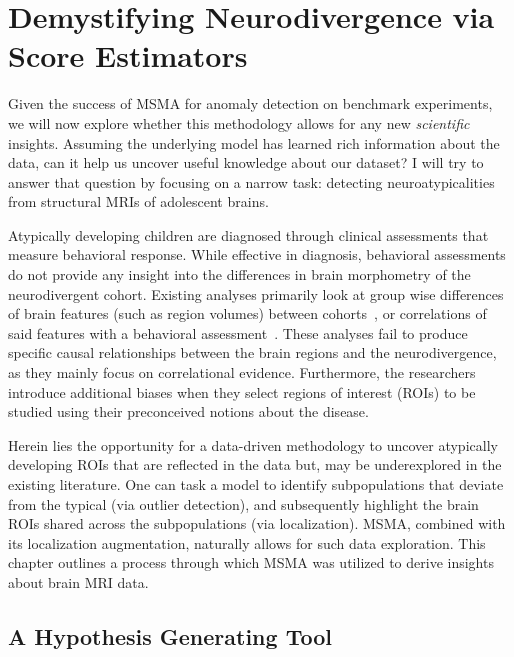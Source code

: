 \chapter{Demystifying Neurodivergence via Score Estimators }
\label{ch:localizing}

Given the success of MSMA for anomaly detection on benchmark experiments, we will now explore whether this methodology allows for any new \textit{scientific} insights.
Assuming the underlying model has learned rich information about the data, can it help us uncover useful knowledge about our dataset? I will try to answer that question by focusing on a narrow task: detecting neuroatypicalities from structural MRIs of adolescent brains.

Atypically developing children are diagnosed through clinical assessments that measure behavioral response. While effective in diagnosis, behavioral assessments do not provide any insight into the differences in brain morphometry of the neurodivergent cohort. Existing analyses primarily look at group wise differences of brain features (such as region volumes) between cohorts~\cite{giraultNeurodevelopmentAutismInfancy2020,hamnerPediatricBrainDevelopment2018}, or correlations of said features with a behavioral assessment~\cite{shenSubcorticalBrainDevelopment2022,brainsci12040439}. These analyses fail to produce specific causal relationships between the brain regions and the neurodivergence, as they mainly focus on correlational evidence.
Furthermore, the researchers introduce additional biases when they select regions of interest (ROIs) to be studied using their preconceived notions about the disease.

Herein lies the opportunity for a data-driven methodology to uncover atypically developing ROIs that are reflected in the data but, may be underexplored in the existing  literature. One can task a model to identify subpopulations that deviate from the typical (via outlier detection), and subsequently highlight the brain ROIs shared across the subpopulations (via localization).  MSMA, combined with its localization augmentation, naturally allows for such data exploration. This chapter outlines a process through which MSMA was utilized to derive insights about brain MRI data.

\section{A Hypothesis Generating Tool}

